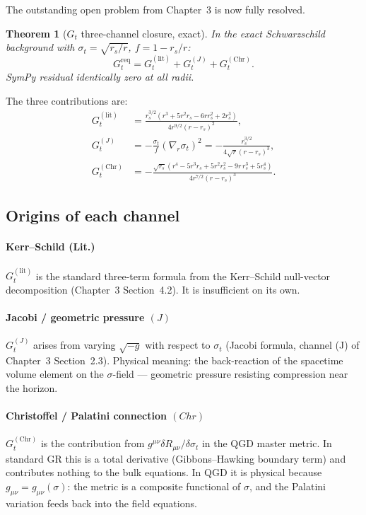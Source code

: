 \documentclass[11pt,a4paper]{article}
\theoremstyle{plain}
\newtheorem{theorem}{Theorem}[section]
\theoremstyle{definition}
\theoremstyle{remark}
\begin{document}
The outstanding open problem from Chapter~3 is now fully resolved.

\begin{theorem}[$G_t$ three-channel closure, exact]\label{thm:Gt}
In the exact Schwarzschild background with $\sigma_t = \sqrt{r_s/r}$,
$f = 1-r_s/r$:
\begin{equation}
  \boxed{G_t^{\mathrm{req}}
  = G_t^{(\mathrm{lit})} + G_t^{(J)} + G_t^{(\mathrm{Chr})}.}
  \label{eq:Gt_decomp}
\end{equation}
SymPy residual identically zero at all radii.
\end{theorem}

The three contributions are:
\begin{align}
  G_t^{(\mathrm{lit})} &= \frac{r_s^{3/2}(r^3+5r^2r_s-6rr_s^2+2r_s^3)}
    {4r^{9/2}(r-r_s)^2},
  \label{eq:Gt_lit}\\[6pt]
  G_t^{(J)} &= -\frac{\sigma_t}{f}(\nabla_r\sigma_t)^2
  = -\frac{r_s^{3/2}}{4\sqrt{r}(r-r_s)^3},
  \label{eq:Gt_J}\\[6pt]
  G_t^{(\mathrm{Chr})} &= \boxed{-\frac{\sqrt{r_s}\!\left(r^4-5r^3r_s
    +5r^2r_s^2-9r\,r_s^3+5r_s^4\right)}{4r^{7/2}(r-r_s)^3}.}
  \label{eq:Gt_Chr}
\end{align}

\subsection{Origins of each channel}

\paragraph{Kerr--Schild (Lit.)}
$G_t^{(\mathrm{lit})}$ is the standard three-term formula from the Kerr--Schild
null-vector decomposition (Chapter~3 Section~4.2).  It is insufficient on its own.

\paragraph{Jacobi / geometric pressure $(J)$}
$G_t^{(J)}$ arises from varying $\sqrt{-g}$ with respect to $\sigma_t$
(Jacobi formula, channel (J) of Chapter~3 Section~2.3).  Physical meaning:
the back-reaction of the spacetime volume element on the $\sigma$-field ---
geometric pressure resisting compression near the horizon.

\paragraph{Christoffel / Palatini connection $(Chr)$}
$G_t^{(\mathrm{Chr})}$ is the contribution from
$g^{\mu\nu}\delta R_{\mu\nu}/\delta\sigma_t$ in the QGD master metric.
In standard GR this is a total derivative (Gibbons--Hawking boundary term)
and contributes nothing to the bulk equations.  In QGD it is physical because
$g_{\mu\nu} = g_{\mu\nu}(\sigma)$: the metric is a composite functional of
$\sigma$, and the Palatini variation feeds back into the field equations.
\end{document}
